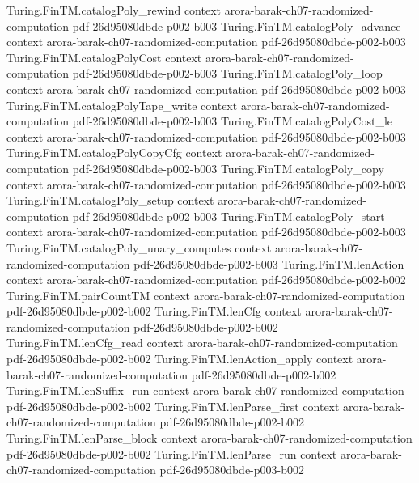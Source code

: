 \begin{theorem}
\proofstep
  {Turing.FinTM.catalogPoly_rewind}
  {context}
  {arora-barak-ch07-randomized-computation}
  {pdf-26d95080dbde-p002-b003}
\proofstep
  {Turing.FinTM.catalogPoly_advance}
  {context}
  {arora-barak-ch07-randomized-computation}
  {pdf-26d95080dbde-p002-b003}
\proofstep
  {Turing.FinTM.catalogPolyCost}
  {context}
  {arora-barak-ch07-randomized-computation}
  {pdf-26d95080dbde-p002-b003}
\proofstep
  {Turing.FinTM.catalogPoly_loop}
  {context}
  {arora-barak-ch07-randomized-computation}
  {pdf-26d95080dbde-p002-b003}
\proofstep
  {Turing.FinTM.catalogPolyTape_write}
  {context}
  {arora-barak-ch07-randomized-computation}
  {pdf-26d95080dbde-p002-b003}
\proofstep
  {Turing.FinTM.catalogPolyCost_le}
  {context}
  {arora-barak-ch07-randomized-computation}
  {pdf-26d95080dbde-p002-b003}
\proofstep
  {Turing.FinTM.catalogPolyCopyCfg}
  {context}
  {arora-barak-ch07-randomized-computation}
  {pdf-26d95080dbde-p002-b003}
\proofstep
  {Turing.FinTM.catalogPoly_copy}
  {context}
  {arora-barak-ch07-randomized-computation}
  {pdf-26d95080dbde-p002-b003}
\proofstep
  {Turing.FinTM.catalogPoly_setup}
  {context}
  {arora-barak-ch07-randomized-computation}
  {pdf-26d95080dbde-p002-b003}
\proofstep
  {Turing.FinTM.catalogPoly_start}
  {context}
  {arora-barak-ch07-randomized-computation}
  {pdf-26d95080dbde-p002-b003}
\proofstep
  {Turing.FinTM.catalogPoly_unary_computes}
  {context}
  {arora-barak-ch07-randomized-computation}
  {pdf-26d95080dbde-p002-b003}
\proofstep
  {Turing.FinTM.lenAction}
  {context}
  {arora-barak-ch07-randomized-computation}
  {pdf-26d95080dbde-p002-b002}
\proofstep
  {Turing.FinTM.pairCountTM}
  {context}
  {arora-barak-ch07-randomized-computation}
  {pdf-26d95080dbde-p002-b002}
\proofstep
  {Turing.FinTM.lenCfg}
  {context}
  {arora-barak-ch07-randomized-computation}
  {pdf-26d95080dbde-p002-b002}
\proofstep
  {Turing.FinTM.lenCfg_read}
  {context}
  {arora-barak-ch07-randomized-computation}
  {pdf-26d95080dbde-p002-b002}
\proofstep
  {Turing.FinTM.lenAction_apply}
  {context}
  {arora-barak-ch07-randomized-computation}
  {pdf-26d95080dbde-p002-b002}
\proofstep
  {Turing.FinTM.lenSuffix_run}
  {context}
  {arora-barak-ch07-randomized-computation}
  {pdf-26d95080dbde-p002-b002}
\proofstep
  {Turing.FinTM.lenParse_first}
  {context}
  {arora-barak-ch07-randomized-computation}
  {pdf-26d95080dbde-p002-b002}
\proofstep
  {Turing.FinTM.lenParse_block}
  {context}
  {arora-barak-ch07-randomized-computation}
  {pdf-26d95080dbde-p002-b002}
\proofstep
  {Turing.FinTM.lenParse_run}
  {context}
  {arora-barak-ch07-randomized-computation}
  {pdf-26d95080dbde-p003-b002}

\end{theorem}
